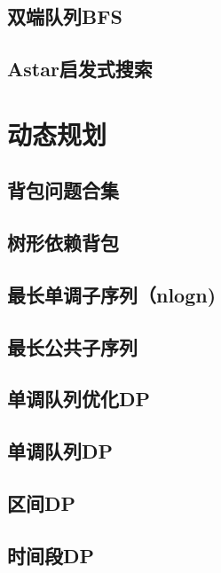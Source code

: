 \section{双端队列BFS}
\raggedbottom
\hrulefill
\section{Astar启发式搜索}
\raggedbottom
\hrulefill

\chapter{动态规划}
\section{背包问题合集}
\raggedbottom
\hrulefill
\section{树形依赖背包}
\raggedbottom
\hrulefill
\section{最长单调子序列（nlogn)}
\raggedbottom
\hrulefill
\section{最长公共子序列}
\raggedbottom
\hrulefill
\section{单调队列优化DP}
\raggedbottom
\hrulefill
\section{单调队列DP}
\raggedbottom
\hrulefill
\section{区间DP}
\raggedbottom
\hrulefill
\section{时间段DP}
\raggedbottom
\hrulefill
